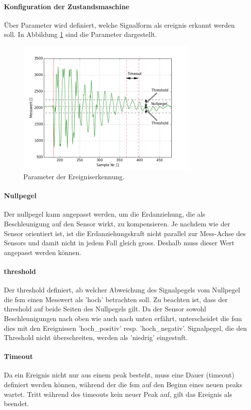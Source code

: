 \paragraph{Konfiguration der Zustandsmaschine}
 Über Parameter wird definiert, welche Signalform als \gls{ereignis} erkannt werden soll. In Abbildung \ref{fig.impact_detection_params} sind die Parameter dargestellt. 
\begin{figure}[H]
	\centering
	\includegraphics[width=0.8\textwidth]{images/impact_params.png}
	\caption{Parameter der Ereigniserkennung.}
	\label{fig.impact_detection_params}
\end{figure}
\paragraph{Nullpegel} Der \gls{nullpegel} kann angepasst werden, um die Erdanziehung, die als Beschleunigung auf den Sensor wirkt, zu kompensieren. Je nachdem wie der Sensor orientiert ist, ist die Erdanziehungskraft nicht parallel zur Mess-Achse des Sensors und damit nicht in jedem Fall gleich gross. Deshalb muss dieser Wert angepasst werden können.
\paragraph{threshold} Der \gls{threshold} definiert, ab welcher Abweichung des Signalpegels vom Nullpegel die \gls{fsm} einen Messwert als 'hoch' betrachten soll. Zu beachten ist, dass der \gls{threshold} auf beide Seiten des Nullpegels gilt. Da der Sensor sowohl Beschleunigungen nach oben wie auch nach unten erfährt, unterscheidet die \gls{fsm} dies mit den Ereignissen 'hoch\_positiv' resp. 'hoch\_negativ'. Signalpegel, die den Threshold nicht überschreiten, werden als 'niedrig' eingestuft.
\paragraph{Timeout} Da ein Ereignis nicht nur aus einem \gls{peak} besteht, muss eine Dauer (\gls{timeout}) definiert werden können, während der die \gls{fsm} auf den Beginn eines neuen \gls{peak}s wartet. Tritt während des \gls{timeout}s kein neuer Peak auf, gilt das Ereignis als beendet.

